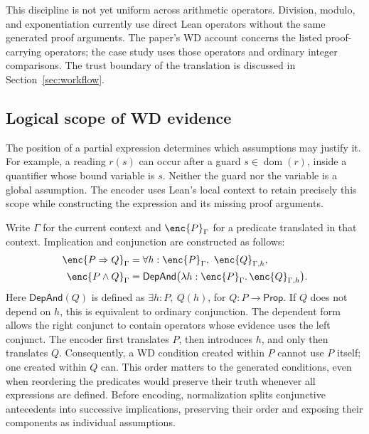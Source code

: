This discipline is not yet uniform across arithmetic operators. Division,
modulo, and exponentiation currently use direct Lean operators without
the same generated proof arguments. The paper's WD account concerns the
listed proof-carrying operators; the case study uses those
operators and ordinary integer comparisons. The trust boundary of the
translation is discussed in Section~\ref{sec:workflow}.

\subsection{Logical scope of WD evidence}

The position of a partial expression determines which assumptions may
justify it. For example, a reading $r(s)$ can occur after a guard
$s\in\operatorname{dom}(r)$, inside a quantifier whose bound variable is
$s$. Neither the guard nor the variable is a global assumption. The
encoder uses Lean's local context to retain precisely this scope while
constructing the expression and its missing proof arguments.

Write $\Gamma$ for the current context and $\enc{P}_\Gamma$ for a
predicate translated in that context. Implication and conjunction are
constructed as follows:
\begin{align*}
  \enc{P\Rightarrow Q}_\Gamma
    &=\forall h:\enc{P}_\Gamma,\ \enc{Q}_{\Gamma,h},\\
  \enc{P\land Q}_\Gamma
    &=\mathsf{DepAnd}\bigl(\lambda h:\enc{P}_\Gamma.\,
      \enc{Q}_{\Gamma,h}\bigr).
\end{align*}
Here $\mathsf{DepAnd}(Q)$ is defined as $\exists h:P,\ Q(h)$, for
$Q:P\to\mathsf{Prop}$. If $Q$ does not depend on $h$, this is equivalent
to ordinary conjunction. The dependent form allows the right conjunct
to contain operators whose evidence uses the left conjunct. The encoder
first translates $P$, then introduces $h$, and only then translates $Q$.
Consequently, a WD condition created within $P$ cannot use $P$ itself;
one created within $Q$ can. This order matters to the generated
conditions, even when reordering the predicates would preserve their
truth whenever all expressions are defined.
Before encoding, normalization splits conjunctive antecedents into
successive implications, preserving their order and exposing their
components as individual assumptions.

